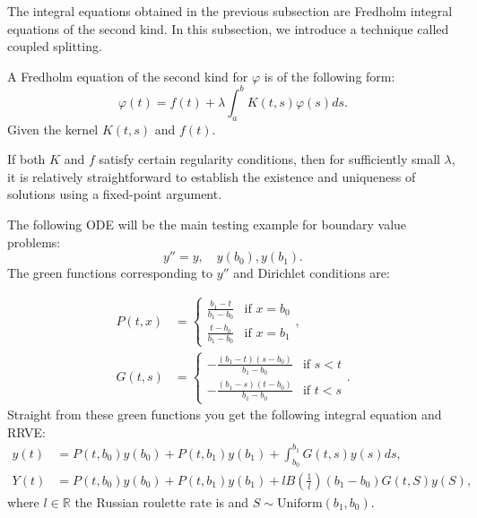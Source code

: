 The integral equations obtained in the previous subsection are Fredholm integral
equations of the second kind. In this subsection, we introduce a technique called
coupled splitting.


\begin{definition}
    A Fredholm equation of the second kind for $\varphi$  is of the following form:
    \begin{equation}
        \varphi(t)=f(t)+\lambda \int_a^b K(t, s) \varphi(s) ds.
    \end{equation}
    Given the kernel  $K(t, s)$  and  $ f(t)$.
\end{definition}

If both $K$ and $f$ satisfy certain regularity conditions, then for sufficiently
small $\lambda$, it is relatively straightforward to establish the existence
and uniqueness of solutions using a fixed-point argument.

\begin{example}[Dirichlet $y''=y$] \label{main dirichlet}
    The following ODE will be the main testing example for
    boundary value problems:
    \begin{equation} \label{eq:main dirichlet}
        y''=y, \quad y(b_{0}),y(b_{1}).
    \end{equation}
    The green functions corresponding to $y''$ and Dirichlet conditions are:

    \begin{align}
        P(t,x) & = \begin{cases}
                       \frac{b_{1}-t}{b_{1}-b_{0}} & \text{if } x = b_{0} \\
                       \frac{t-b_{0}}{b_{1}-b_{0}} & \text{if } x = b_{1}
                   \end{cases},       \\
        G(t,s) & = \begin{cases}
                       -\frac{(b_{1}-t)(s-b_{0})}{b_{1}-b_{0}} & \text{if } s<t \\
                       -\frac{(b_{1}-s)(t-b_{0})}{b_{1}-b_{0}} & \text{if } t<s
                   \end{cases}.
    \end{align}
    Straight from these green functions you get the following integral equation and RRVE:
    \begin{align} \label{inteq:main dirichlet}
        y(t) & = P(t,b_{0}) y(b_{0}) + P(t,b_{1}) y(b_{1}) +
        \int_{b_{0}}^{b_{1}} G(t,s)y(s) ds,                  \\
        Y(t) & = P(t,b_{0}) y(b_{0}) + P(t,b_{1}) y(b_{1})
        + l B\left(\frac{1}{l} \right)(b_{1}-b_{0}) G(t,S)y(S) , \label{RRVE:main dirichlet}
    \end{align}
    where $l \in \mathbb{R}$ the Russian roulette rate is and
    $S \sim \text{Uniform}(b_{1},b_{0})$.

\end{example}


